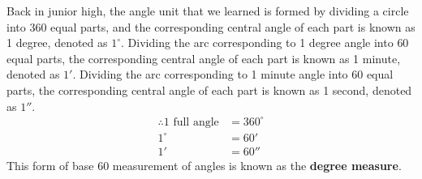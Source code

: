 \documentclass{report}
\begin{document}
Back in junior high, the angle unit that we learned is formed by dividing a circle into $360$ equal parts, and the corresponding central angle of each part is known as 1 degree, denoted as $1^\circ$. Dividing the arc corresponding to 1 degree angle into $60$ equal parts, the corresponding central angle of each part is known as 1 minute, denoted as $1'$. Dividing the arc corresponding to 1 minute angle into $60$ equal parts, the corresponding central angle of each part is known as 1 second, denoted as $1''$.
\begin{align*}
    \therefore 1 \text{ full angle} & = 360^\circ\\
    1^\circ & = 60'\\
    1' & = 60''
\end{align*}
This form of base 60 measurement of angles is known as the \textbf{degree measure}.
\end{document}
